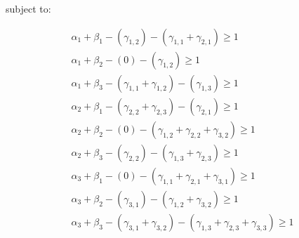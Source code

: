 \documentclass[twoside]{article}
\begin{document}
subject to:

\begin{align*}
    \alpha_1 + \beta_1 - (\gamma_{1,2}) - (\gamma_{1,1} + \gamma_{2,1}) \geq 1\\
    \alpha_1 + \beta_2 - (0) - (\gamma_{1,2}) \geq 1\\
    \alpha_1 + \beta_3 - (\gamma_{1,1} + \gamma_{1,2}) - (\gamma_{1,3}) \geq 1\\
    \alpha_2 + \beta_1 - (\gamma_{2,2} + \gamma_{2,3}) - (\gamma_{2,1}) \geq 1\\
    \alpha_2 + \beta_2 - (0) - (\gamma_{1,2} + \gamma_{2,2} + \gamma_{3,2}) \geq 1\\
    \alpha_2 + \beta_3 - (\gamma_{2,2}) - (\gamma_{1,3} + \gamma_{2,3}) \geq 1\\
    \alpha_3 + \beta_1 - (0) - (\gamma_{1,1} + \gamma_{2,1} + \gamma_{3,1}) \geq 1\\
    \alpha_3 + \beta_2 - (\gamma_{3,1}) - (\gamma_{1,2} + \gamma_{3,2}) \geq 1\\
    \alpha_3 + \beta_3 - (\gamma_{3,1} + \gamma_{3,2}) - (\gamma_{1,3} + \gamma_{2,3} + \gamma_{3,3}) \geq 1\\
\end{align*}



\end{document}

